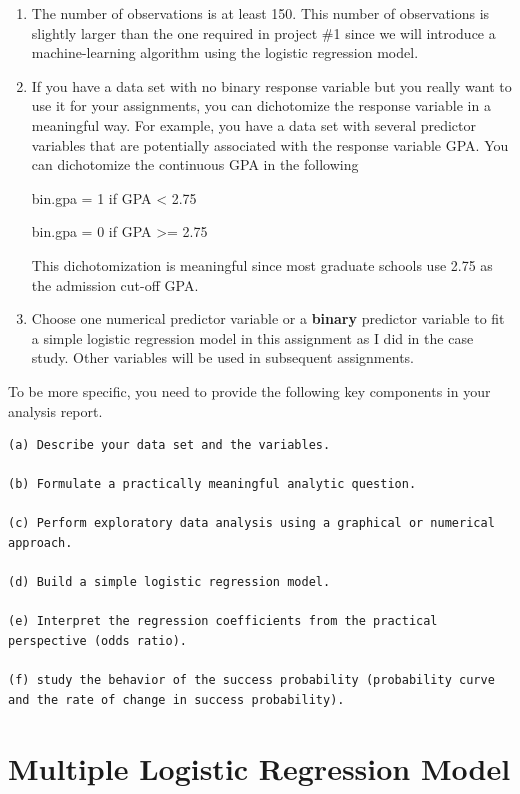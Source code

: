 \documentclass[
]{book}
\begin{document}
\begin{enumerate}
\def\labelenumi{\arabic{enumi}.}
\setcounter{enumi}{1}
\item
  The number of observations is at least 150. This number of observations is slightly larger than the one required in project \#1 since we will introduce a machine-learning algorithm using the logistic regression model.
\item
  If you have a data set with no binary response variable but you really want to use it for your assignments, you can dichotomize the response variable in a meaningful way. For example, you have a data set with several predictor variables that are potentially associated with the response variable GPA. You can dichotomize the continuous GPA in the following

  bin.gpa = 1 if GPA \textless{} 2.75

  bin.gpa = 0 if GPA \textgreater= 2.75

  This dichotomization is meaningful since most graduate schools use 2.75 as the admission cut-off GPA.
\item
  Choose one numerical predictor variable or a \textbf{binary} predictor variable to fit a simple logistic regression model in this assignment as I did in the case study. Other variables will be used in subsequent assignments.
\end{enumerate}

To be more specific, you need to provide the following key components in your analysis report.

\begin{verbatim}
(a) Describe your data set and the variables.

(b) Formulate a practically meaningful analytic question.

(c) Perform exploratory data analysis using a graphical or numerical approach.

(d) Build a simple logistic regression model.

(e) Interpret the regression coefficients from the practical perspective (odds ratio).

(f) study the behavior of the success probability (probability curve and the rate of change in success probability).
\end{verbatim}

\hypertarget{multiple-logistic-regression-model}{%
\chapter{Multiple Logistic Regression Model}\label{multiple-logistic-regression-model}}
\end{document}
